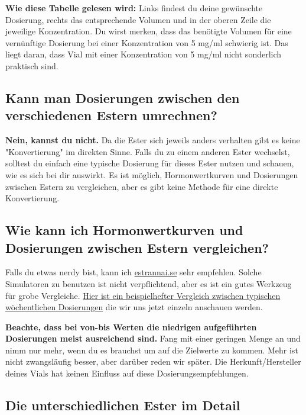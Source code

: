 \documentclass{article}
\begin{document}
\textbf{Wie diese Tabelle gelesen wird:} Links findest du deine gewünschte Dosierung, rechts das entsprechende Volumen und in der oberen Zeile die jeweilige Konzentration. Du wirst merken, dass das benötigte Volumen für eine vernünftige Dosierung bei einer Konzentration von 5 mg/ml schwierig ist. Das liegt daran, dass Vial mit einer Konzentration von 5 mg/ml nicht sonderlich praktisch sind.

\subsection{Kann man Dosierungen zwischen den verschiedenen Estern umrechnen?}

\textbf{Nein, kannst du nicht.} Da die Ester sich jeweils anders verhalten gibt es keine "Konvertierung" im direkten Sinne. Falls du zu einem anderen Ester wechselst, solltest du einfach eine typische Dosierung für dieses Ester nutzen und schauen, wie es sich bei dir auswirkt. Es ist möglich, Hormonwertkurven und Dosierungen zwischen Estern zu vergleichen, aber es gibt keine Methode für eine direkte Konvertierung.

\subsection{Wie kann ich Hormonwertkurven und Dosierungen zwischen Estern vergleichen?}

Falls du etwas nerdy bist, kann ich \href{https://estrannai.se}{estrannai.se} sehr empfehlen. Solche Simulatoren zu benutzen ist nicht verpflichtend, aber es ist ein gutes Werkzeug für grobe Vergleiche. \href{https://estrannai.se/\#i0__cu,7,7,1-cu,5,7,3-cu,5,7,2}{Hier ist ein beispielhefter Vergleich zwischen typischen wöchentlichen Dosierungen} die wir uns jetzt einzeln anschauen werden.

\textbf{Beachte, dass bei von-bis Werten die niedrigen aufgeführten Dosierungen meist ausreichend sind.} Fang mit einer geringen Menge an und nimm nur mehr, wenn du es brauchst um auf die Zielwerte zu kommen. Mehr ist nicht zwangsläufig besser, aber darüber reden wir später. Die Herkunft/Hersteller deines Vials hat keinen Einfluss auf diese Dosierungsempfehlungen.

\subsection*{Die unterschiedlichen Ester im Detail}
\end{document}
